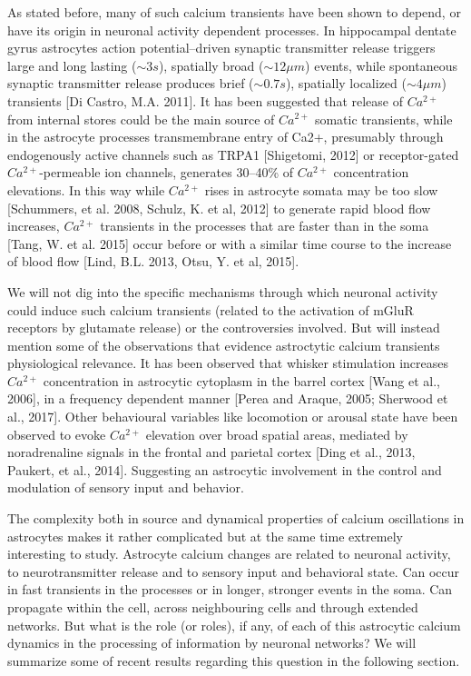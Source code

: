 As stated before, many of such calcium transients have been shown to depend, or have its origin in neuronal activity dependent processes. 
In hippocampal dentate gyrus astrocytes action potential–driven synaptic transmitter release triggers large and long lasting ($\sim3 s$), spatially broad ($\sim12 \mu m$) events, while spontaneous synaptic transmitter release produces brief ($\sim 0.7 s$), spatially localized ($\sim 4 \mu m$) transients [Di Castro, M.A. 2011].
It has been suggested that release of $Ca^{2+}$ from internal stores could be the main source of $Ca^{2+}$ somatic transients, while in the astrocyte processes transmembrane entry of Ca2+, presumably through endogenously active channels such as TRPA1 [Shigetomi, 2012] or receptor-gated $Ca^{2+}$-permeable ion channels, generates 30–40\% of $Ca^{2+}$ concentration elevations. 
In this way while $Ca^{2+}$ rises in astrocyte somata may be too slow [Schummers, et al. 2008, Schulz, K. et al, 2012] to generate rapid blood flow increases, $Ca^{2+}$ transients in the processes that are faster than in the soma [Tang, W. et al. 2015] occur before or with a similar time course to the increase of blood flow [Lind, B.L. 2013, Otsu, Y. et al, 2015].

We will not dig into the specific mechanisms through which neuronal activity could induce such calcium transients (related to the activation of mGluR receptors by glutamate release) or the controversies involved. 
But will instead mention some of the observations that evidence astroctytic calcium transients physiological relevance. 
It has been observed that whisker stimulation increases $Ca^{2+}$ concentration in astrocytic cytoplasm in the barrel cortex [Wang et al., 2006], in a frequency dependent manner [Perea and Araque, 2005; Sherwood et al., 2017]. Other behavioural variables like locomotion or arousal state have been observed to evoke $Ca^{2+}$ elevation over broad spatial areas, mediated by noradrenaline signals in the frontal and parietal cortex [Ding et al., 2013, Paukert, et al., 2014].
Suggesting an astrocytic involvement in the control and modulation of sensory input and behavior. 

The complexity both in source and dynamical properties of calcium oscillations in astrocytes makes it rather complicated but at the same time extremely interesting to study.
Astrocyte calcium changes are related to neuronal activity, to neurotransmitter release and to sensory input and behavioral state.
Can occur in fast transients in the processes or in longer, stronger events in the soma. 
Can propagate within the cell, across neighbouring cells and through extended networks.
But what is the role (or roles), if any, of each of this astrocytic calcium dynamics in the processing of information by neuronal networks? We will summarize some of recent results regarding this question in the following section.

